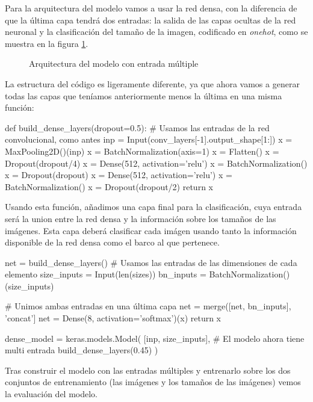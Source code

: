 Para la arquitectura del modelo vamos a usar la red densa, con la diferencia de
que la última capa tendrá dos entradas: la salida de las capas ocultas de la
red neuronal y la clasificación del tamaño de la imagen, codificado en
\textit{onehot}, como se muestra en la figura \ref{multi_input_arch}.

\begin{figure}
    \caption{Arquitectura del modelo con entrada múltiple}
\label{multi_input_arch}
\end{figure}

La estructura del código es ligeramente diferente, ya que ahora vamos a generar
todas las capas que teníamos anteriormente menos la última en una misma
función:

\begin{python}
def build_dense_layers(dropout=0.5):
    # Usamos las entradas de la red convolucional, como antes
    inp = Input(conv_layers[-1].output_shape[1:])
    x = MaxPooling2D()(inp)
    x = BatchNormalization(axis=1)
    x = Flatten()
    x = Dropout(dropout/4)
    x = Dense(512, activation='relu')
    x = BatchNormalization()
    x = Dropout(dropout)
    x = Dense(512, activation='relu')
    x = BatchNormalization()
    x = Dropout(dropout/2)
    return x

\end{python}

Usando esta función, añadimos una capa final para la clasificación, cuya entrada
será la union entre la red densa y la información sobre los tamaños de las
imágenes. Esta capa deberá clasificar cada imágen usando tanto la información
disponible de la red densa como el barco al que pertenece.

\begin{python}
net = build_dense_layers()
# Usamos las entradas de las dimensiones de cada elemento
size_inputs = Input(len(sizes))
bn_inputs = BatchNormalization()(size_inputs)

# Unimos ambas entradas en una última capa
net = merge([net, bn_inputs], 'concat']
net = Dense(8, activation='softmax')(x)
return x


dense_model = keras.models.Model(
    [inp, size_inputs],  # El modelo ahora tiene multi entrada
    build_dense_layers(0.45)
)
\end{python}

Tras construir el modelo con las entradas múltiples y entrenarlo sobre los dos conjuntos de entrenamiento (las imágenes y los tamaños de las imágenes) vemos la evaluación del modelo.


